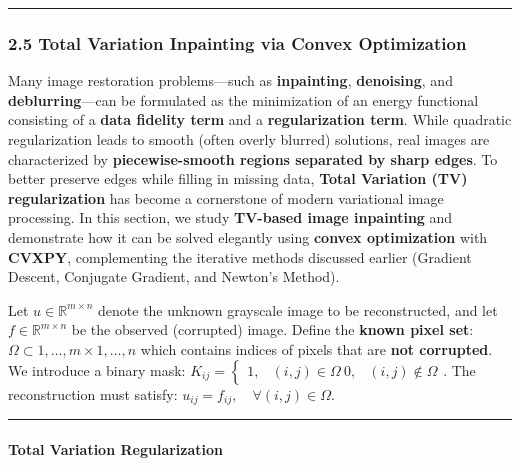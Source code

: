 \documentclass[11pt]{article}
\begin{document}
\begin{center}\rule{0.5\linewidth}{0.5pt}\end{center}

\hypertarget{total-variation-inpainting-via-convex-optimization}{%
\subsubsection{\texorpdfstring{\textbf{2.5 Total Variation Inpainting
via Convex
Optimization}}{2.5 Total Variation Inpainting via Convex Optimization}}\label{total-variation-inpainting-via-convex-optimization}}

Many image restoration problems---such as \textbf{inpainting},
\textbf{denoising}, and \textbf{deblurring}---can be formulated as the
minimization of an energy functional consisting of a \textbf{data
fidelity term} and a \textbf{regularization term}. While quadratic
regularization leads to smooth (often overly blurred) solutions, real
images are characterized by \textbf{piecewise-smooth regions separated
by sharp edges}. To better preserve edges while filling in missing data,
\textbf{Total Variation (TV) regularization} has become a cornerstone of
modern variational image processing. In this section, we study
\textbf{TV-based image inpainting} and demonstrate how it can be solved
elegantly using \textbf{convex optimization} with \textbf{CVXPY},
complementing the iterative methods discussed earlier (Gradient Descent,
Conjugate Gradient, and Newton's Method).

Let \(u \in \mathbb{R}^{m \times n}\) denote the unknown grayscale image
to be reconstructed, and let \(f \in \mathbb{R}^{m \times n}\) be the
observed (corrupted) image. Define the \textbf{known pixel set}:
\(\Omega \subset {1,\dots,m} \times {1,\dots,n}\) which contains indices
of pixels that are \textbf{not corrupted}. We introduce a binary mask:
\(K_{ij} = \begin{cases} 1, & (i,j) \in \Omega \
0, & (i,j) \notin \Omega \end{cases}\). The reconstruction must satisfy:
\(u_{ij} = f_{ij}, \quad \forall (i,j) \in \Omega\).

\begin{center}\rule{0.5\linewidth}{0.5pt}\end{center}

\hypertarget{total-variation-regularization}{%
\paragraph{\texorpdfstring{\textbf{Total Variation
Regularization}}{Total Variation Regularization}}\label{total-variation-regularization}}
\end{document}
